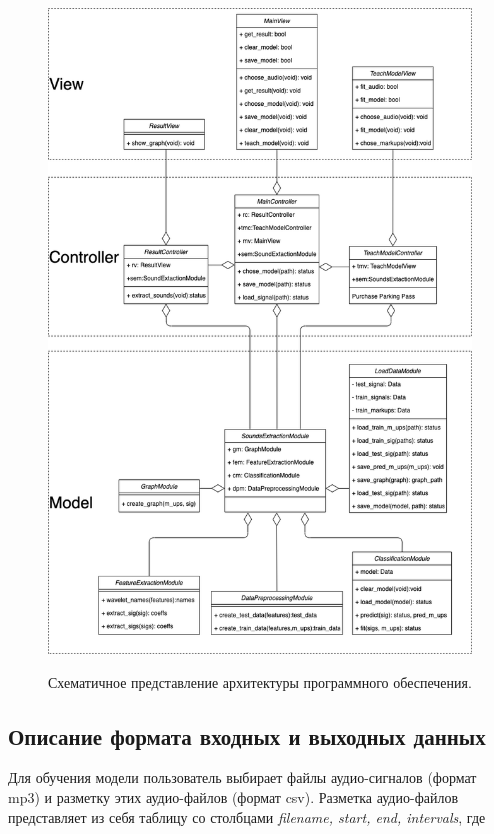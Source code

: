 \documentclass[utf8x, 14pt, oneside, a4paper]{article}
\begin{document}
	\begin{figure}[h!]
		\begin{center}
			{\includegraphics[scale = 0.4]{img/uml.png}}
		\end{center}
		\caption{Схематичное представление архитектуры программного обеспечения.}
		\label{ris:uml}
	\end{figure}

	\subsection{Описание формата входных и выходных данных}
	
	Для обучения модели пользователь выбирает файлы аудио-сигналов (формат mp3) и разметку этих аудио-файлов (формат csv). Разметка аудио-файлов представляет из себя таблицу со столбцами \textit{filename, start, end, intervals}, где
	
\end{document}
